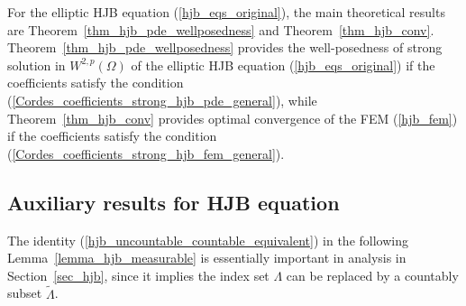 \documentclass[12pt]{amsart}
\theoremstyle{definition}
\theoremstyle{remark}
\begin{document}
For the elliptic HJB equation (\ref{hjb_eqs_original}), the main theoretical results are 
Theorem~\ref{thm_hjb_pde_wellposedness} and Theorem~\ref{thm_hjb_conv}.  
Theorem~\ref{thm_hjb_pde_wellposedness} provides the well-posedness of 
strong solution in $W^{2,p}(\Omega)$ of the elliptic HJB equation (\ref{hjb_eqs_original}) if the coefficients 
satisfy the condition (\ref{Cordes_coefficients_strong_hjb_pde_general}), 
while Theorem~\ref{thm_hjb_conv} provides optimal convergence of the FEM (\ref{hjb_fem}) 
if the coefficients satisfy the condition (\ref{Cordes_coefficients_strong_hjb_fem_general}).

\subsection{Auxiliary results for HJB equation}

The identity (\ref{hjb_uncountable_countable_equivalent}) in the following Lemma~\ref{lemma_hjb_measurable} is 
essentially important in analysis in Section~\ref{sec_hjb}, since it implies the index set $\Lambda$ can be 
replaced by a countably subset $\tilde{\Lambda}$.
\end{document}
